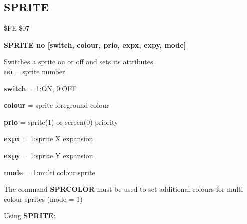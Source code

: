 
\newpage
\subsection{SPRITE}
\begin{description}[leftmargin=3cm,style=nextline]
\item [Token:] \$FE \$07
\item [Format:] {\bf SPRITE no [switch, colour, prio, expx, expy, mode]}
\item [Usage:]  Switches a sprite on or off and sets its attributes. \\

                {\bf no} = sprite number

                {\bf switch} = 1:ON, 0:OFF

                {\bf colour} = sprite foreground colour

                {\bf prio} = sprite(1) or screen(0) priority

                {\bf expx} = 1:sprite X expansion

                {\bf expy} = 1:sprite Y expansion

                {\bf mode} = 1:multi colour sprite

\item [Remarks:] The command {\bf SPRCOLOR} must be used to set
                additional colours
                for multi colour sprites (mode = 1)

\item [Example:] Using {\bf SPRITE}:
\end{description}


\newpage
